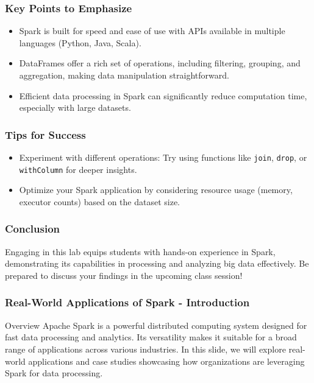 \documentclass[aspectratio=169]{beamer}
\begin{document}
\begin{frame}
    \frametitle{Key Points to Emphasize}
    \begin{itemize}
        \item Spark is built for speed and ease of use with APIs available in multiple languages (Python, Java, Scala).
        \item DataFrames offer a rich set of operations, including filtering, grouping, and aggregation, making data manipulation straightforward.
        \item Efficient data processing in Spark can significantly reduce computation time, especially with large datasets.
    \end{itemize}
\end{frame}

\begin{frame}
    \frametitle{Tips for Success}
    \begin{itemize}
        \item Experiment with different operations: Try using functions like \texttt{join}, \texttt{drop}, or \texttt{withColumn} for deeper insights.
        \item Optimize your Spark application by considering resource usage (memory, executor counts) based on the dataset size.
    \end{itemize}
\end{frame}

\begin{frame}
    \frametitle{Conclusion}
    Engaging in this lab equips students with hands-on experience in Spark, demonstrating its capabilities in processing and analyzing big data effectively. Be prepared to discuss your findings in the upcoming class session!
\end{frame}

\begin{frame}[fragile]
  \frametitle{Real-World Applications of Spark - Introduction}
  \begin{block}{Overview}
    Apache Spark is a powerful distributed computing system designed for fast data processing and analytics. 
    Its versatility makes it suitable for a broad range of applications across various industries. 
    In this slide, we will explore real-world applications and case studies showcasing how organizations are leveraging Spark for data processing.
  \end{block}
\end{frame}
\end{document}
